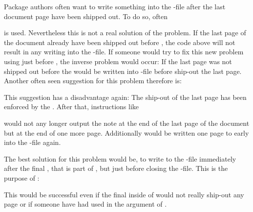 \begin{Declaration}
\end{Declaration}%
Package authors often want to write something into the -file after
the last document page have been shipped out. To do so, often
\begin{lstcode}
  \AtEndDocument{%
    \if@filesw
      \write\@auxout{%
        \protect\writethistoaux%
      }%
    \fi
  } 
\end{lstcode}
is used. Nevertheless this is not a real solution of the problem. If the last
page of the document already have been shipped out before
, the code above will not result in any
writing into the -file. If someone would try to fix this new problem
using  just before , the inverse problem would
occur: If the last page was not shipped out before
 the  would be written
into -file before ship-out the last page. Another often seen
suggestion for this problem therefore is:
\begin{lstcode}
  \AtEndDocument{%
    \if@filesw
      \clearpage
      \immediate\write\@auxout{%
        \protect\writethistoaux%
      }%
    \fi
  } 
\end{lstcode}
This suggestion has a disadvantage again: The ship-out of the last page has
been enforced by the . After that, instructions
like
\begin{lstcode}
\end{lstcode}
would not any longer output the note at the end of the last page of the
document but at the end of one more page. Additionally 
would be written one page to early into the -file again.

The best solution for this problem would be, to write to the -file
immediately after the final , that is part of
, but just before closing the
-file. This is the purpose of :
\begin{lstcode}
  \BeforeClosingMainAux{%
    \if@filesw
      \immediate\write\@auxout{%
        \protect\writethistoaux%
      }%
    \fi
  }
\end{lstcode}
This would be successful even if the final 
inside of  would not really ship-out any page
or if someone have had used  in the argument of
.

